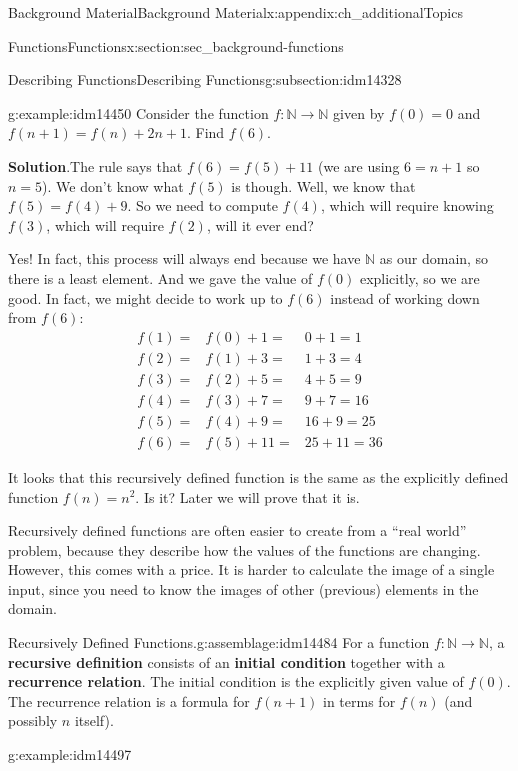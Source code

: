 \documentclass[oneside,10pt,]{book}
\newcommand{\terminology}[1]{\textbf{#1}}
\numberwithin{equation}{chapter}
\def\N{\mathbb N}
\newcommand{\amp}{&}
\begin{document}
\begin{appendixptx}{Background Material}{}{Background Material}{}{}{x:appendix:ch_additionalTopics}
\begin{sectionptx}{Functions}{}{Functions}{}{}{x:section:sec_background-functions}
\begin{subsectionptx}{Describing Functions}{}{Describing Functions}{}{}{g:subsection:idm14328}
\begin{example}{}{g:example:idm14450}%
Consider the function \(f:\N \to \N\) given by \(f(0) = 0\) and \(f(n+1) = f(n) + 2n+1\).  Find \(f(6)\).%
\par\smallskip%
\noindent\textbf{Solution}.\hypertarget{g:solution:idm14457}{}\quad{}The rule says that \(f(6) = f(5) + 11\) (we are using \(6 = n+1\) so \(n = 5\)).  We don't know what \(f(5)\) is though.  Well, we know that \(f(5) = f(4) + 9\).  So we need to compute \(f(4)\), which will require knowing \(f(3)\), which will require \(f(2)\),\textellipsis{} will it ever end?%
\par
Yes!  In fact, this process will always end because we have \(\N\) as our domain, so there is a least element.  And we gave the value of \(f(0)\) explicitly, so we are good.  In fact, we might decide to work up to \(f(6)\) instead of working down from \(f(6)\):%
\begin{align*}
f(1) = \amp f(0) + 1 = \amp 0 + 1 = 1\\
f(2) = \amp f(1) + 3 = \amp 1 + 3 = 4\\
f(3) = \amp f(2) + 5 = \amp 4 + 5 = 9\\
f(4) = \amp f(3) + 7 = \amp 9 + 7 = 16\\
f(5) = \amp f(4) + 9 = \amp 16 + 9 = 25\\
f(6) = \amp f(5) + 11 = \amp 25 + 11 = 36
\end{align*}
%
\par
It looks that this recursively defined function is the same as the explicitly defined function \(f(n) = n^2\).  Is it?  Later we will prove that it is.%
\end{example}
Recursively defined functions are often easier to create from a ``real world'' problem, because they describe how the values of the functions are changing.  However, this comes with a price. It is harder to calculate the image of a single input, since you need to know the images of other (previous) elements in the domain.%
\begin{assemblage}{Recursively Defined Functions.}{g:assemblage:idm14484}%
For a function \(f:\N \to \N\), a \terminology{recursive definition} consists of an \terminology{initial condition} together with a \terminology{recurrence relation}.  The initial condition is the explicitly given value of \(f(0)\). The recurrence relation is a formula for \(f(n+1)\) in terms for \(f(n)\) (and possibly \(n\) itself).%
\end{assemblage}
\begin{example}{}{g:example:idm14497}%

\end{example}
\end{subsectionptx}
\end{sectionptx}
\end{appendixptx}
\end{document}
